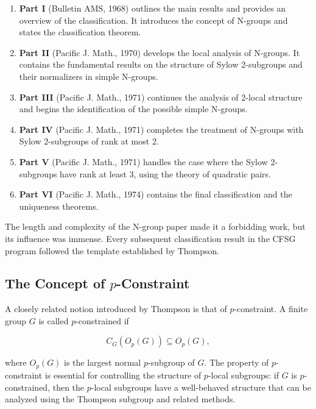 \begin{enumerate}
\item \textbf{Part I} (Bulletin AMS, 1968) outlines the main results and provides an overview of the classification. It introduces the concept of N-groups and states the classification theorem.

\item \textbf{Part II} (Pacific J. Math., 1970) develops the local analysis of N-groups. It contains the fundamental results on the structure of Sylow 2-subgroups and their normalizers in simple N-groups.

\item \textbf{Part III} (Pacific J. Math., 1971) continues the analysis of 2-local structure and begins the identification of the possible simple N-groups.

\item \textbf{Part IV} (Pacific J. Math., 1971) completes the treatment of N-groups with Sylow 2-subgroups of rank at most 2.

\item \textbf{Part V} (Pacific J. Math., 1971) handles the case where the Sylow 2-subgroups have rank at least 3, using the theory of quadratic pairs.

\item \textbf{Part VI} (Pacific J. Math., 1974) contains the final classification and the uniqueness theorems.
\end{enumerate}

The length and complexity of the N-group paper made it a forbidding work, but its influence was immense. Every subsequent classification result in the CFSG program followed the template established by Thompson.

\subsection{The Concept of \texorpdfstring{\(p\)}{p}-Constraint}

A closely related notion introduced by Thompson is that of \(p\)-constraint. A finite group \(G\) is called \(p\)-constrained if

\[
C_G(O_p(G)) \subseteq O_p(G),
\]

where \(O_p(G)\) is the largest normal \(p\)-subgroup of \(G\). The property of \(p\)-constraint is essential for controlling the structure of \(p\)-local subgroups: if \(G\) is \(p\)-constrained, then the \(p\)-local subgroups have a well-behaved structure that can be analyzed using the Thompson subgroup and related methods.

